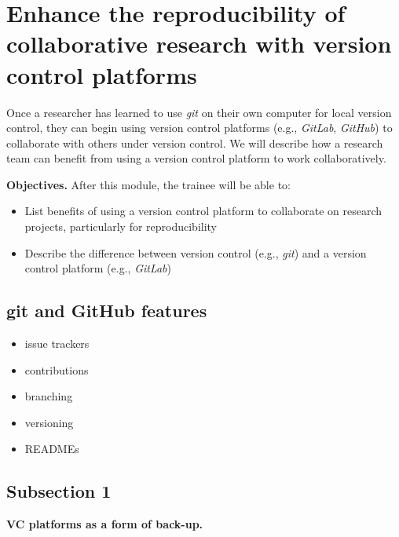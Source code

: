\documentclass[]{tufte-book}
\providecommand{\tightlist}{%
  \setlength{\itemsep}{0pt}\setlength{\parskip}{0pt}}
\begin{document}
\hypertarget{enhance-the-reproducibility-of-collaborative-research-with-version-control-platforms}{%
\section{Enhance the reproducibility of collaborative research with version control platforms}\label{enhance-the-reproducibility-of-collaborative-research-with-version-control-platforms}}

Once a researcher has learned to use \emph{git} on their own computer for
local version control, they can begin using version control platforms (e.g.,
\emph{GitLab}, \emph{GitHub}) to collaborate with others under version
control. We will describe how a research team can benefit from using a version
control platform to work collaboratively.

\textbf{Objectives.} After this module, the trainee will be able to:

\begin{itemize}
\tightlist
\item
  List benefits of using a version control platform to collaborate
  on research projects, particularly for reproducibility
\item
  Describe the difference between version control (e.g., \emph{git}) and
  a version control platform (e.g., \emph{GitLab})
\end{itemize}

\hypertarget{git-and-github-features}{%
\subsection{git and GitHub features}\label{git-and-github-features}}

\begin{itemize}
\tightlist
\item
  issue trackers
\item
  contributions
\item
  branching
\item
  versioning
\item
  READMEs
\end{itemize}

\hypertarget{subsection-1-5}{%
\subsection{Subsection 1}\label{subsection-1-5}}

\textbf{VC platforms as a form of back-up.}
\end{document}

